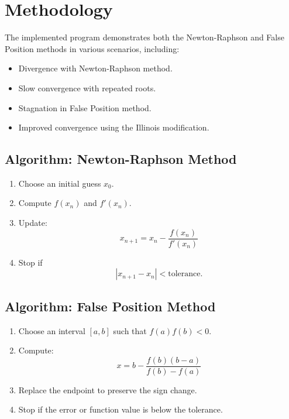 \documentclass[12pt,a4paper]{article}
\begin{document}
\section{Methodology}
The implemented program demonstrates both the Newton-Raphson and False Position methods in various scenarios, including:
\begin{itemize}
    \item Divergence with Newton-Raphson method.
    \item Slow convergence with repeated roots.
    \item Stagnation in False Position method.
    \item Improved convergence using the Illinois modification.
\end{itemize}

\subsection{Algorithm: Newton-Raphson Method}
\begin{enumerate}
    \item Choose an initial guess $x_0$.
    \item Compute $f(x_n)$ and $f'(x_n)$.
    \item Update:
    \begin{equation}
    x_{n+1} = x_n - \frac{f(x_n)}{f'(x_n)}
    \end{equation}
    \item Stop if 
    \begin{equation}
    |x_{n+1} - x_n| < \text{tolerance}.
    \end{equation}
\end{enumerate}

\subsection{Algorithm: False Position Method}
\begin{enumerate}
    \item Choose an interval $[a, b]$ such that $f(a)f(b) < 0$.
    \item Compute:
    \begin{equation}
    x = b - \frac{f(b)(b-a)}{f(b) - f(a)}
    \end{equation}
    \item Replace the endpoint to preserve the sign change.
    \item Stop if the error or function value is below the tolerance.
\end{enumerate}
\end{document}
